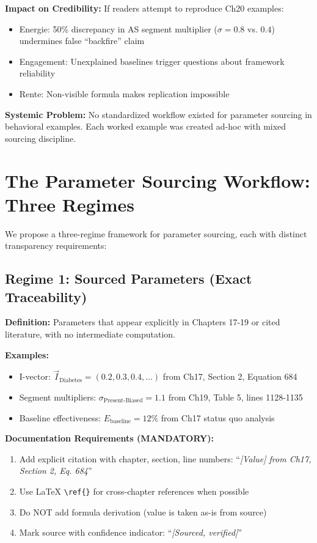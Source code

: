 \textbf{Impact on Credibility:} If readers attempt to reproduce Ch20 examples:
\begin{itemize}[nosep]
\item Energie: 50\% discrepancy in AS segment multiplier ($\sigma = 0.8$ vs. $0.4$) undermines false ``backfire'' claim
\item Engagement: Unexplained baselines trigger questions about framework reliability
\item Rente: Non-visible formula makes replication impossible
\end{itemize}

\textbf{Systemic Problem:} No standardized workflow existed for parameter sourcing in behavioral examples. Each worked example was created ad-hoc with mixed sourcing discipline.


\section{The Parameter Sourcing Workflow: Three Regimes}
\label{sec:jjj-workflow}

We propose a three-regime framework for parameter sourcing, each with distinct transparency requirements:

\subsection{Regime 1: Sourced Parameters (Exact Traceability)}
\label{subsec:jjj-sourced}

\textbf{Definition:} Parameters that appear explicitly in Chapters 17-19 or cited literature, with no intermediate computation.

\textbf{Examples:}
\begin{itemize}[nosep]
\item I-vector: $\vec{I}_{\text{Diabetes}} = (0.2, 0.3, 0.4, ...)$ from Ch17, Section 2, Equation 684
\item Segment multipliers: $\sigma_{\text{Present-Biased}} = 1.1$ from Ch19, Table 5, lines 1128-1135
\item Baseline effectiveness: $E_{\text{baseline}} = 12\%$ from Ch17 status quo analysis
\end{itemize}

\textbf{Documentation Requirements (MANDATORY):}
\begin{enumerate}
\item Add explicit citation with chapter, section, line numbers: ``\textit{[Value] from Ch17, Section 2, Eq. 684}''
\item Use LaTeX \verb|\ref{}| for cross-chapter references when possible
\item Do NOT add formula derivation (value is taken as-is from source)
\item Mark source with confidence indicator: ``\textit{[Sourced, verified]}''
\end{enumerate}

